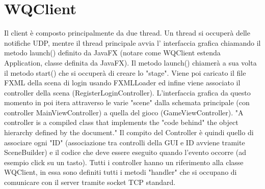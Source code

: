 \documentclass{article}
\begin{document}
\section{WQClient}
Il client è composto principalmente da due thread. Un thread si occuperà delle notifiche UDP, mentre il thread principale avvia l' interfaccia grafica chiamando il metodo launch() definito da JavaFX (notare come WQClient estenda Application, classe definita da JavaFX). Il metodo launch() chiamerà a sua volta il metodo start() che si occuperà di creare lo "stage". Viene poi caricato il file FXML della scena di login usando FXMLLoader ed infine viene associato il controller della scena (RegisterLoginController). L'interfaccia grafica da questo momento in poi itera attraverso le varie "scene" dalla schemata principale (con controller MainViewController) a quella del gioco (GameViewController). "A controller is a compiled class that implements the "code behind" the object hierarchy defined by the document." \cite{javafxDocumentation} Il compito del Controller è quindi quello di associare ogni "ID" (associazione tra controlli della GUI e ID avviene tramite SceneBuilder) e il codice che deve essere eseguito quando l'evento occorre (ad esempio click su un tasto). Tutti i controller hanno un riferimento alla classe WQClient, in essa sono definiti tutti i metodi "handler" che si occupano di comunicare con il server tramite socket TCP standard.
\end{document}
